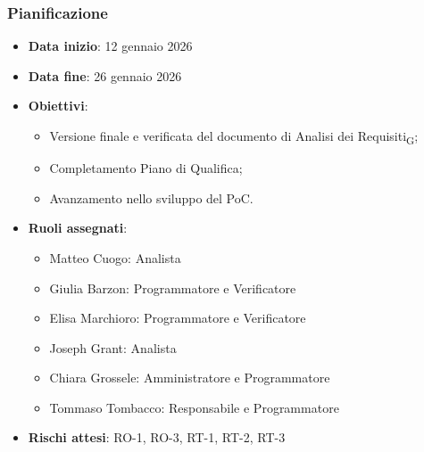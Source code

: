 \documentclass[11pt,a4paper]{article}
\newcommand{\gls}[1]{#1\textsubscript{G}}
\begin{document}
\subsubsection{Pianificazione}
\begin{itemize}
    \item \textbf{Data inizio}: 12 gennaio 2026
    \item \textbf{Data fine}: 26 gennaio 2026
    \item \textbf{Obiettivi}:
    \begin{itemize}
        \item Versione finale e verificata del documento di \gls{Analisi dei Requisiti};
        \item Completamento Piano di Qualifica;
        \item Avanzamento nello sviluppo del PoC.
    \end{itemize}
    \item \textbf{Ruoli assegnati}:
    \begin{itemize}
        \item Matteo Cuogo: Analista 
        \item Giulia Barzon: Programmatore e Verificatore
        \item Elisa Marchioro: Programmatore e Verificatore
        \item Joseph Grant: Analista
        \item Chiara Grossele: Amministratore e Programmatore
        \item Tommaso Tombacco: Responsabile e Programmatore 
    \end{itemize}
    \item \textbf{Rischi attesi}: RO-1, RO-3, RT-1, RT-2, RT-3
\end{itemize}
\end{document}
